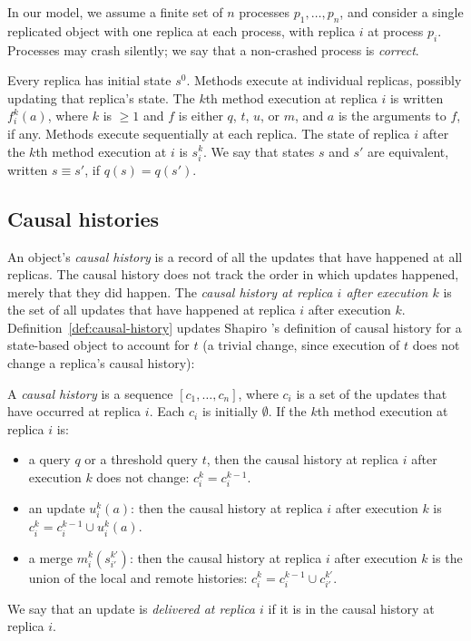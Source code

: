 In our model, we assume a finite set of $n$ processes $p_1, \dots,
p_n$, and consider a single replicated object with one replica at each
process, with replica $i$ at process $p_i$.  Processes may crash
silently; we say that a non-crashed process is \emph{correct}.

Every replica has initial state $s^0$.  Methods execute at individual
replicas, possibly updating that replica's state.  The $k$th method
execution at replica $i$ is written $f^{k}_{i}(a)$, where $k$ is $\geq
1$ and $f$ is either $q$, $t$, $u$, or $m$, and $a$ is the arguments
to $f$, if any.  Methods execute sequentially at each replica.  The
state of replica $i$ after the $k$th method execution at $i$ is
$s^{k}_{i}$.  We say that states $s$ and $s'$ are equivalent, written
$s \equiv s'$, if $q(s) = q(s')$.

\subsection{Causal histories}

An object's \emph{causal history} is a record of all the updates that
have happened at all replicas.  The causal history does not track the
order in which updates happened, merely that they did happen.  The
\emph{causal history at replica $i$ after execution $k$} is the set of
all updates that have happened at replica $i$ after execution $k$.
Definition~\ref{def:causal-history} updates Shapiro \etal's definition
of causal history for a state-based object to account for $t$ (a
trivial change, since execution of $t$ does not change a replica's
causal history):
\begin{definition}
  \label{def:causal-history}
  A \emph{causal history} is a sequence $[c_1, \dots, c_n]$, where
  $c_i$ is a set of the updates that have occurred at
  replica $i$.  Each $c_i$ is initially $\emptyset$.  If the $k$th
  method execution at replica $i$ is:
  \begin{itemize}
    \item a query $q$ or a threshold query $t$, then the causal
      history at replica $i$ after execution $k$ does not change:
      $c^{k}_{i} = c^{k-1}_{i}$.
    \item an update $u^{k}_{i}(a)$: then the causal history at replica
      $i$ after execution $k$ is $c^{k}_{i} = c^{k-1}_{i} \cup {
      u^{k}_{i}(a) }$.
    \item a merge $m^{k}_{i}(s^{k'}_{i'})$: then the causal history at
      replica $i$ after execution $k$ is the union of the local and
      remote histories: $c^{k}_{i} = c^{k-1}_{i} \cup c^{k'}_{i'}$.
  \end{itemize}
\end{definition}
We say that an update is \emph{delivered at replica $i$} if it is in
the causal history at replica $i$.

